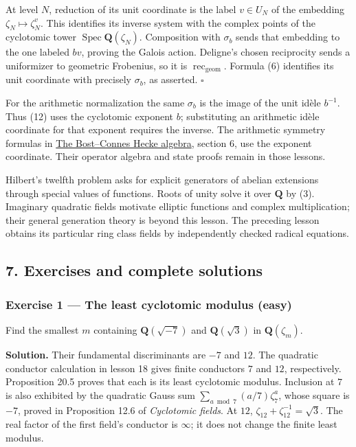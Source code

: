 \documentclass[11pt,a4paper]{article}
\begin{document}
At level \(N\), reduction of its unit coordinate is the label
\(v\in U_N\) of the embedding \(\zeta_N\mapsto\zeta_N^v\). This
identifies its inverse system with the complex points of the cyclotomic
tower \(\operatorname{Spec}\mathbf Q(\zeta_N)\). Composition with
\(\sigma_b\) sends that embedding to the one labeled \(bv\), proving the
Galois action. Deligne's chosen reciprocity sends a uniformizer to
geometric Frobenius, so it is \(\operatorname{rec}_{\mathrm{geom}}\).
Formula (6) identifies its unit coordinate with precisely \(\sigma_b\),
as asserted. \(\square\)

For the arithmetic normalization the same \(\sigma_b\) is the image of
the unit idèle \(b^{-1}\). Thus (12) uses the cyclotomic exponent \(b\);
substituting an arithmetic idèle coordinate for that exponent requires
the inverse. The arithmetic symmetry formulas in
\href{https://kokunoyumeto.github.io/open-math-courses/courses/NT-CFT/proof-dependencies.html\#QSM-L03}{The
Bost--Connes Hecke algebra}, section 6, use the exponent coordinate.
Their operator algebra and state proofs remain in those lessons.

Hilbert's twelfth problem asks for explicit generators of abelian
extensions through special values of functions. Roots of unity solve it
over \(\mathbf Q\) by (3). Imaginary quadratic fields motivate elliptic
functions and complex multiplication; their general generation theory is
beyond this lesson. The preceding lesson obtains its particular ring
class fields by independently checked radical equations.

\subsection{7. Exercises and complete
solutions}\label{exercises-and-complete-solutions}

\subsubsection{Exercise 1 --- The least cyclotomic modulus
(easy)}\label{exercise-1-the-least-cyclotomic-modulus-easy}

Find the smallest \(m\) containing \(\mathbf Q(\sqrt{-7})\) and
\(\mathbf Q(\sqrt3)\) in \(\mathbf Q(\zeta_m)\).

\textbf{Solution.} Their fundamental discriminants are \(-7\) and
\(12\). The quadratic conductor calculation in lesson 18 gives finite
conductors \(7\) and \(12\), respectively. Proposition 20.5 proves that
each is its least cyclotomic modulus. Inclusion at \(7\) is also
exhibited by the quadratic Gauss sum \(\sum_{a\bmod7}(a/7)\zeta_7^a\),
whose square is \(-7\), proved in Proposition 12.6 of \emph{Cyclotomic
fields}. At \(12\), \(\zeta_{12}+\zeta_{12}^{-1}=\sqrt3\). The real
factor of the first field's conductor is \(\infty\); it does not change
the finite least modulus.
\end{document}

